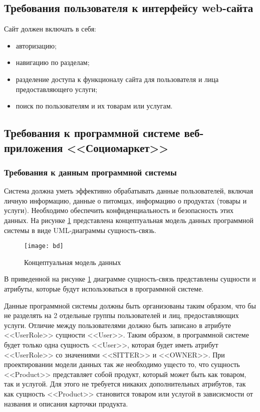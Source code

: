 \subsection{Требования пользователя к интерфейсу web-сайта}

Сайт должен включать в себя:
\begin{itemize}
    \item авторизацию;
    \item навигацию по разделам;
    \item разделение доступа к функционалу сайта для пользователя и лица предоставляющего услуги;
    \item поиск по пользователям и их товарам или услугам.
\end{itemize}


\subsection{Требования к программной системе веб-приложения <<Социомаркет>>}
\subsubsection{Требования к данным программной системы}
Система должна уметь эффективно обрабатывать данные пользователей, включая личную информацию, данные о питомцах, информацию о продуктах (товары и услуги). Необходимо обеспечить конфиденциальность и безопасность этих данных.
На рисунке  \ref{bd:image} представлена концептуальная модель данных программной системы в виде UML-диаграммы сущность-связь.

\begin{figure}[ht]
\centering
\texttt{[image: bd]}
\caption{Концептуальная модель данных}
\label{bd:image}
\end{figure}

В приведенной на рисунке  \ref{bd:image} диаграмме сущность-связь представлены сущности и атрибуты, которые будут использоваться в программной системе.

Данные программной системы должны быть организованы таким образом, что бы не разделять на 2 отдельные группы пользователей и лиц, предоставляющих услуги. Отличие между пользователями должно быть записано в атрибуте <<UserRole>> сущности <<User>>. Таким образом, в программной системе будет только одна сущность <<User>>, которая будет иметь атрибут <<UserRole>> со значениями <<SITTER>> и <<OWNER>>.
При проектировании модели данных так же необходимо ущесто то, что сущность <<Product>> представляет собой продукт, который может быть как товаром, так и услугой. Для этого не требуется никаких дополнительных атрибутов, так как сущность <<Product>> становится товаром или услугой в зависисмости от названия и описания карточки продукта.


